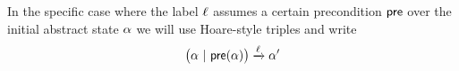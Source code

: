 In the specific case where the label $\ell$ assumes a certain
precondition $\mathsf{pre}$ over the initial abstract state $\alpha$ we
will use Hoare-style triples and write
\[ \big(\abstate\ |\ \apre(\abstate)\big) \xrightarrow{\alabel}  \abstate' \]








